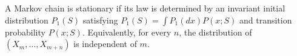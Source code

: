 A Markov chain is stationary if its law is determined by an invariant initial distribution $P_1(S)$ satisfying $P_1(S) = \int P_1(dx) P(x; S)$ and transition probability $P(x; S)$. Equivalently, for every $n$, the distribution of $(X_m, \ldots, X_{m+n})$ is independent of $m$.
